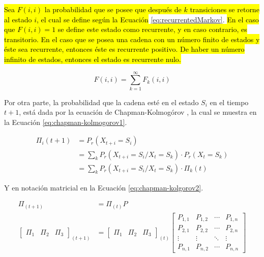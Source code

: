 \hl{Sea $F(i,i)$ la probabilidad que se posee que después de $k$ transiciones se retorne al estado $i$, el cual se define según la Ecuación} \ref{eq:recurrentedMarkov}. \hl{En el caso que $F(i,i)=1$ se define este estado como recurrente, y en caso contrario, es transitorio. En el caso que se posea una cadena con un número finito de estados y éste sea recurrente, entonces éste es recurrente positivo. De haber un número infinito de estados, entonces el estado es recurrente nulo.}

\begin{equation} \label{eq:recurrentedMarkov}
	F(i,i) = \sum_{k=1}^{\infty}{F_k(i,i)}
\end{equation}

Por otra parte, la probabilidad que la cadena esté en el estado $S_i$ en el tiempo $t+1$, está dada por la ecuación de Chapman-Kolmogórov \citep{Papoulis1984}, la cual se muestra en la Ecuación \ref{eq:chapman-kolmogorov1}.

\begin{equation} \label{eq:chapman-kolmogorov1}
\begin{split}
	\Pi_{i} (t+1) &= P_r(X_{t+i}=S_i) \\
				  &= \sum _{k} P_r(X_{t+i} = S_i / X_t = S_k)·P_r(X_t = S_k)\\
				  &= \sum _{k} P_r(X_{t+i} = S_i / X_t = S_k)·\Pi_{k} (t)
\end{split}	
\end{equation}

Y en notación matricial en la Ecuación \ref{eq:chapman-kolgorov2}.

\begin{equation} \label{eq:chapman-kolgorov2}
\begin{split}
	\Pi_{(t+1)} &= \Pi_{(t)}P\\
	\begin{bmatrix}
		\Pi_1 & \Pi_2 & \Pi_3
	\end{bmatrix} _{(t+1)}
	&= \begin{bmatrix}
		\Pi_1 & \Pi_2 & \Pi_3
	\end{bmatrix} _{(t)}
	\begin{bmatrix}
		P_{1,1} & P_{1,2} & \cdots & P_{1,n} \\
		P_{2,1} & P_{2,2} & \cdots & P_{2,n} \\
		\vdots  & \vdots  & \ddots & \vdots  \\
		P_{n,1} & P_{n,2} & \cdots & P_{n,n}
	\end{bmatrix}
\end{split}
\end{equation}

